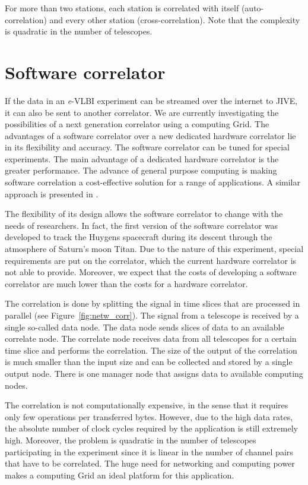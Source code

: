 \documentclass[12pt]{article}
\begin{document}
For more than two stations, each station is correlated with itself
(auto-correlation) and every other station (cross-correlation). Note
that the complexity is quadratic in the number of telescopes.

\section{Software correlator}
If the data in an {\it e}-VLBI experiment can be streamed over the internet
to JIVE, it can also be sent to another correlator. We are currently
investigating the possibilities of a next generation correlator using
a computing Grid. The advantages of a software correlator over a new
dedicated hardware correlator lie in its flexibility and accuracy. The
software correlator can be tuned for special experiments. The main
advantage of a dedicated hardware correlator is the greater
performance. The advance of general purpose computing is making
software correlation a cost-effective solution for a range of
applications. A similar approach is presented in \cite{deller-2007}.

The flexibility of its design allows the software correlator to change
with the needs of researchers. In fact, the first version of the
software correlator was developed to track the Huygens spacecraft
during its descent through the atmosphere of Saturn's moon Titan. Due
to the nature of this experiment, special requirements are put
on the correlator, which the current hardware correlator is not able
to provide.  Moreover, we expect that the costs of developing a
software correlator are much lower than the costs for a hardware
correlator.

The correlation is done by splitting the signal in time slices that
are processed in parallel (see Figure~\ref{fig:netw_corr}). The signal
from a telescope is received by a single so-called data node.  The
data node sends slices of data to an available correlate node. The
correlate node receives data from all telescopes for a certain time
slice and performs the correlation. The size of the output of the
correlation is much smaller than the input size and can be collected
and stored by a single output node.  There is one manager node that
assigns data to available computing nodes.

The correlation is not computationally expensive, in the sense that it
requires only few operations per transferred bytes. However, due to
the high data rates, the absolute number of clock cycles required by
the application is still extremely high. Moreover, the problem is
quadratic in the number of telescopes participating in the experiment
since it is linear in the number of channel pairs that have to be
correlated. The huge need for networking and computing power makes a
computing Grid an ideal platform for this application.
\end{document}
